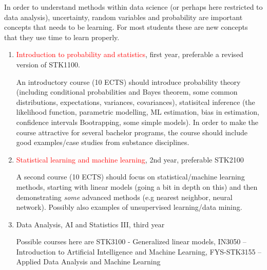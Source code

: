 \documentclass[oneside,final,10pt]{article}
\begin{document}
 In order to understand methods within data science (or perhaps here restricted to data analysis), uncertainty, random variables and probability are important concepts that needs to be learning. For most students these are new concepts that they use time to learn properly. 
\begin{enumerate}
    \item \textcolor{red}{Introduction to probability and statistics}, first year, preferable a revised version of STK1100.
    
    An introductory course (10 ECTS) should introduce probability theory (including conditional probabilities and Bayes theorem, some common distributions, expectations, variances, covariances), statisitcal inference (the likelihood function, parametric modelling, ML estimation, bias in estimation, confidence intervals Bootrapping, some simple models). In order to make the course attractive for several bachelor programs, the course should include good examples/case studies from substance disciplines.
    \item \textcolor{red}{Statistical learning and machine learning}, 2nd year, preferable STK2100
    
    A second course (10 ECTS) should focus on statistical/machine learning methods, starting with linear models (going a bit in depth on this) and then demonstrating \emph{some} advanced methods (e.g nearest neighbor, neural network). Possibly also examples of unsupervised learning/data mining.

    \item Data Analysis, AI and Statistics III, third year
    
    Possible courses here are STK3100 - Generalized linear models,  
IN3050 – Introduction to Artificial Intelligence and Machine Learning, FYS-STK3155 – Applied Data Analysis and Machine Learning 
\end{enumerate}
\end{document}
